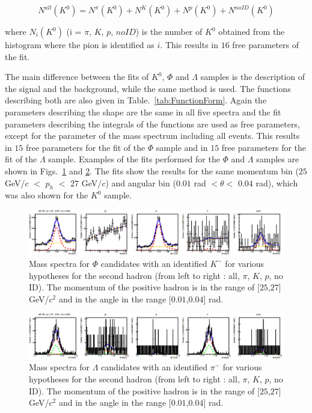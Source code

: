\begin{equation}
  N^{all}(K^0) = N^{\pi}(K^0) + N^{K}(K^0) + N^{p}(K^0) + N^{noID}(K^0)
\end{equation}

where $N_i(K^0)$ (i = $\pi$, $K$, $p$, $noID$) is the number of $K^0$ obtained from the histogram where the pion is identified as $i$. This results in $16$ free parameters of the fit.

The main difference between the fits of $K^0$, $\Phi$ and $\Lambda$ samples is the description of the signal and the background, while the same method is used. The functions describing both are also given in Table.~\ref{tab:FunctionForm}. Again the parameters describing the shape are the same in all five spectra and the fit parameters  describing the integrals of the functions are used as free parameters, except for the parameter of the mass spectrum including all events. This results in $15$ free parameters for the fit of the $\Phi$ sample and in $15$ free parameters for the fit of the $\Lambda$ sample. Examples of the fits performed for the $\Phi$ and $\Lambda$ samples are shown in Figs.~\ref{pic:PhiMassSpectra} and \ref{pic:LambdaMassSpectra}. The fits show the results for the same momentum bin ($25$ GeV/$c$ $<$ $p_h$ $<$ $27$ GeV/$c$) and angular bin ($0.01$ rad $< \theta <$ $0.04$ rad), which was also shown for the $K^0$ sample.

\begin{figure}[!h]
  \centering
	\includegraphics[scale=0.3]{./gfx/PhiMassSpectra.png}
	\caption{Mass spectra for $\Phi$ candidates with an identified $K^-$ for various hypotheses for the second hadron (from left to right : all, $\pi$, $K$, $p$, no ID). The momentum of the positive hadron is in the range of [$25$,$27$] GeV/$c^2$ and in the angle in the range [$0.01$,$0.04$] rad.}
	\label{pic:PhiMassSpectra}
\end{figure}

\begin{figure}[!h]
  \centering
	\includegraphics[scale=0.3]{./gfx/LambdaMassSpectra.png}
	\caption{Mass spectra for $\Lambda$ candidates with an identified $\pi^-$ for various hypotheses for the second hadron (from left to right : all, $\pi$, $K$, $p$, no ID). The momentum of the positive hadron is in the range of [$25$,$27$] GeV/$c^2$ and in the angle in the range [$0.01$,$0.04$] rad.}
	\label{pic:LambdaMassSpectra}
\end{figure}

